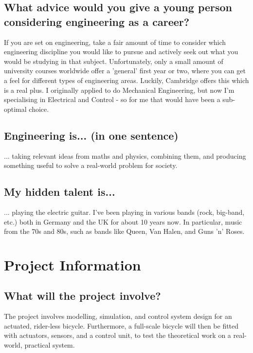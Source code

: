 \documentclass[]{article}
\begin{document}
\subsection{What advice would you give a young person considering engineering as a career?}

If you are set on engineering, take a fair amount of time to consider which engineering discipline you would like to pursue and actively seek out what you would be studying in that subject. Unfortunately, only a small amount of university courses worldwide offer a 'general' first year or two, where you can get a feel for different types of engineering areas. Luckily, Cambridge offers this which is a real plus. I originally applied to do Mechanical Engineering, but now I'm specialising in Electrical and Control - so for me that would have been a sub-optimal choice.

\subsection{Engineering is... (in one sentence)}

... taking relevant ideas from maths and physics, combining them, and producing something useful to solve a real-world problem for society.

\subsection{My hidden talent is...}

... playing the electric guitar. I've been playing in various bands (rock, big-band, 	etc.) both in Germany and the UK for about 10 years now. In particular, music from	the 70s and 80s, such as bands like Queen, Van Halen, and Guns 'n' Roses.

\section{Project Information}

\subsection{What will the project involve?}

The project involves modelling, simulation, and control system design for an actuated, rider-less bicycle. Furthermore, a full-scale bicycle will then be fitted with actuators, sensors, and a control unit, to test the theoretical work on a real-world, practical system.
\end{document}
